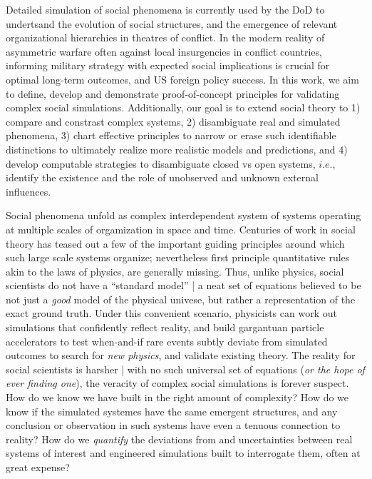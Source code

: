 \documentclass[onecolumn, compsoc,11pt]{IEEEtran}
\begin{document}


Detailed simulation of social phenomena is currently used by the DoD to undertsand the evolution  of social structures, and the emergence of relevant  organizational hierarchies  in theatres of conflict. In the modern reality of asymmetric warfare often against local insurgencies in conflict countries, informing military strategy with expected social implications is crucial for optimal long-term outcomes, and US  foreign policy success.
In this work, we aim to define, develop and demonstrate proof-of-concept principles for validating  complex social simulations. Additionally, our goal is to  extend social theory to 1)  compare and constrast complex systems, 2)  disambiguate real and simulated phenomena,   3) chart effective principles to narrow or erase such identifiable distinctions to ultimately realize more realistic models and predictions, and 4) develop computable strategies  to disambiguate closed vs open systems, $i.e.$, identify the existence and the role of  unobserved and unknown  external influences.

Social phenomena unfold as complex interdependent system of systems operating at multiple scales  of orgamization in space and time. Centuries of work in social theory  has teased out a few of the important  guiding principles around which such large scale  systems organize; nevertheless first principle quantitative rules  akin to the laws of physics, are generally  missing. Thus, unlike physics, social scientists do not have a ``standard model'' | a neat set of equations  believed  to be not just a \textit{good} model of the physical univese, but rather a representation of the exact ground truth. Under  this convenient  scenario, physicists  can work out simulations that confidently reflect reality, and build gargantuan particle accelerators to test when-and-if  rare events subtly deviate from simulated outcomes to search for \textit{new physics}, and validate existing theory. The reality for social scientists is harsher | with no such universal set of equations (\textit{or the hope of ever finding one}), the veracity of complex social simulations is forever suspect. How do we know we have built in the right amount of complexity? How do we know if the simulated systemes have the same emergent structures, and any conclusion or observation in such systems have even a tenuous  connection to  reality? How do we \textit{quantify} the deviations from and uncertainties between real systems of interest  and engineered simulations built to interrogate them, often at great expense?
\end{document}
